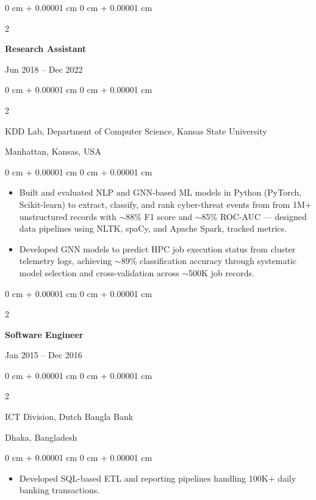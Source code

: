 \documentclass[10pt, letterpaper]{article}
\newenvironment{highlights}{
    \begin{itemize}[
        topsep=0.10 cm,
        parsep=0.10 cm,
        partopsep=0pt,
        itemsep=0pt,
        leftmargin=0 cm + 10pt
    ]
}{
    \end{itemize}
} %
\newenvironment{onecolentry}{
    \begin{adjustwidth}{
        0 cm + 0.00001 cm
    }{
        0 cm + 0.00001 cm
    }
}{
    \end{adjustwidth}
} %
\newenvironment{twocolentry}[2][]{
    \onecolentry
    \def\secondColumn{#2}
    \setcolumnwidth{\fill, 4.5 cm}
    \begin{paracol}{2}
}{
    \switchcolumn \raggedleft \secondColumn
    \end{paracol}
    \endonecolentry
} %
\begin{document}
    \vspace{1mm}

    \begin{twocolentry}{Jun 2018 -- Dec 2022}
        \textbf{Research Assistant}
    \end{twocolentry}
    \begin{twocolentry}{Manhattan, Kansas, USA}
       KDD Lab, Department of Computer Science, Kansas State University
    \end{twocolentry}
    \vspace{0.10 cm}
    \begin{onecolentry}
        \begin{highlights}
            \item Built and evaluated NLP and GNN-based ML models in Python (PyTorch, Scikit-learn) to extract, classify, and rank cyber-threat events from from 1M+ unstructured records with $\sim$88\% F1 score and $\sim$85\% ROC-AUC — designed data pipelines using NLTK, spaCy, and Apache Spark, tracked metrics.
            
            \item Developed GNN models to predict HPC job execution status from cluster telemetry logs, achieving $\sim$89\% classification accuracy through systematic model selection and cross-validation across $\sim$500K job records.
        \end{highlights}
    \end{onecolentry}

    \vspace{0.1 cm}
    \begin{twocolentry}{Jan 2015 -- Dec 2016}
        \textbf{Software Engineer}
    \end{twocolentry}
    \begin{twocolentry}{Dhaka, Bangladesh}
       ICT Division, Dutch Bangla Bank
    \end{twocolentry}

    \begin{onecolentry}
        \begin{highlights}
            \item Developed SQL-based ETL and reporting pipelines handling 100K+ daily banking transactions.
        \end{highlights}
    \end{onecolentry}

\end{document}
